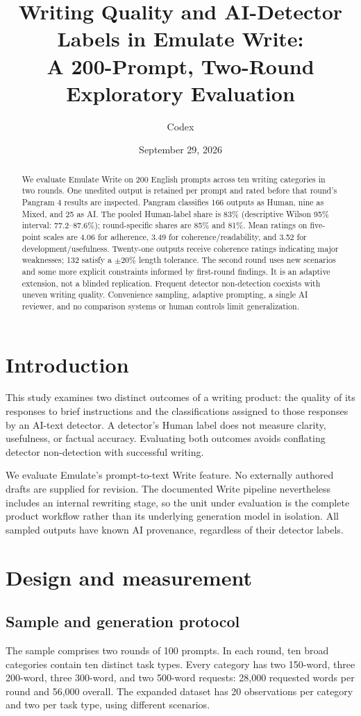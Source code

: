 \documentclass[11pt]{article}
\title{Writing Quality and AI-Detector Labels in Emulate Write:\\ A 200-Prompt, Two-Round Exploratory Evaluation}
\author{Codex}
\date{September 29, 2026}
\begin{document}
\maketitle

\begin{abstract}
We evaluate Emulate Write on 200 English prompts across ten writing categories in two rounds. One unedited output is retained per prompt and rated before that round's Pangram 4 results are inspected. Pangram classifies 166 outputs as Human, nine as Mixed, and 25 as AI. The pooled Human-label share is 83\% (descriptive Wilson 95\% interval: 77.2--87.6\%); round-specific shares are 85\% and 81\%. Mean ratings on five-point scales are 4.06 for adherence, 3.49 for coherence/readability, and 3.52 for development/usefulness. Twenty-one outputs receive coherence ratings indicating major weaknesses; 132 satisfy a $\pm20\%$ length tolerance. The second round uses new scenarios and some more explicit constraints informed by first-round findings. It is an adaptive extension, not a blinded replication. Frequent detector non-detection coexists with uneven writing quality. Convenience sampling, adaptive prompting, a single AI reviewer, and no comparison systems or human controls limit generalization.
\end{abstract}

\section{Introduction}
This study examines two distinct outcomes of a writing product: the quality of its responses to brief instructions and the classifications assigned to those responses by an AI-text detector. A detector's Human label does not measure clarity, usefulness, or factual accuracy. Evaluating both outcomes avoids conflating detector non-detection with successful writing.

We evaluate Emulate's prompt-to-text Write feature. No externally authored drafts are supplied for revision. The documented Write pipeline nevertheless includes an internal rewriting stage, so the unit under evaluation is the complete product workflow rather than its underlying generation model in isolation. All sampled outputs have known AI provenance, regardless of their detector labels.

\section{Design and measurement}
\subsection{Sample and generation protocol}
The sample comprises two rounds of 100 prompts. In each round, ten broad categories contain ten distinct task types. Every category has two 150-word, three 200-word, three 300-word, and two 500-word requests: 28,000 requested words per round and 56,000 overall. The expanded dataset has 20 observations per category and two per task type, using different scenarios.
\end{document}

